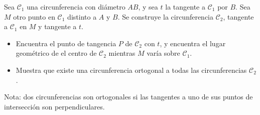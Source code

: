 Sea $\mathcal C_1$ una circunferencia con diámetro $AB$, y sea $t$ la tangente a $\mathcal C_1$ por $B$. Sea $M$ otro punto en $\mathcal C_1$ distinto a $A$ y $B$. Se construye la circunferencia $\mathcal C_2$, tangente a $\mathcal C_1$ en $M$ y tangente a $t$. 
 \begin{itemize} 
 \item  Encuentra el punto de tangencia $P$ de $\mathcal C_2$ con $t$, y encuentra el lugar geométrico de el centro de $\mathcal C_2$ mientras $M$ varía sobre $\mathcal C_1$.
 \item  Muestra que existe una circunferencia ortogonal a todas las circunferencias $\mathcal C_2$.
 \end{itemize}  
Nota: dos circunferencias son ortogonales si las tangentes a uno de sus puntos de intersección son perpendiculares.